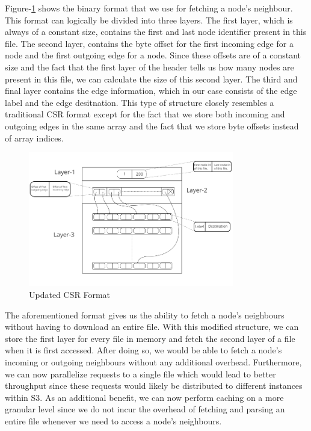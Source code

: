 \medskip
Figure-\ref{fig:csrFormat} shows the binary format that we use for fetching a
node's neighbour. This format can logically be divided into three layers. The
first layer, which is always of a constant size, contains the first and last
node identifier present in this file. The second layer, contains the byte offset
for the first incoming edge for a node and the first outgoing edge for a node.
Since these offsets are of a constant size and the fact that the first layer of
the header tells us how many nodes are present in this file, we can calculate
the size of this second layer. The third and final layer contains the edge
information, which in our case consists of the edge label and the edge
desitnation. This type of structure closely resembles a traditional CSR format
except for the fact that we store both incoming and outgoing edges in the same
array and the fact that we store byte offsets instead of array indices.
\begin{figure}[ht]
    \centering
    \includegraphics[width=0.8\textwidth]{figures/csrFormat.png}
    \caption{Updated CSR Format}
    \label{fig:csrFormat}
\end{figure}

\medskip
The aforementioned format gives us the ability to fetch a node's neighbours
without having to download an entire file. With this modified structure, we can
store the first layer for every file in memory and fetch the second layer of a
file when it is first accessed. After doing so, we would be able to fetch a
node's incoming or outgoing neighbours without any additional overhead.
Furthermore, we can now parallelize requests to a single file which would lead
to better throughput since these requests would likely be distributed to
different instances within S3. As an additional benefit, we can now perform
caching on a more granular level since we do not incur the overhead of fetching
and parsing an entire file whenever we need to access a node's neighbours.

